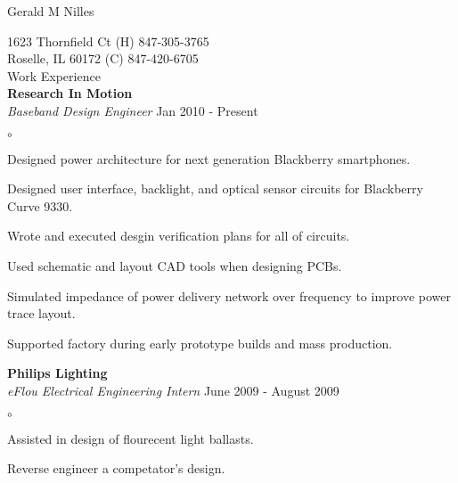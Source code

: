 \documentclass[12pt, letterpaper]{letter}
\begin{document}
\pagestyle{empty}


\newcommand{\myname}[1]{\begin{center} \Huge #1 \normalsize \\ \end{center}}
\newcommand{\myhead}[1]{\LARGE #1 \normalsize \\}
\newcommand{\company}[1]{\hspace*{.5cm} \textbf{#1} \\}
\newcommand{\position}[2]{\hspace*{.5cm} \emph{#1} \hfill #2 \\}
\newenvironment{skills}{\begin{list}{$\circ$}{} \parskip0pt \topsep0pt }{\end{list}}
\newcommand{\skill}[1]{ \item #1 }

\myname{Gerald M Nilles}

1623 Thornfield Ct  \hfill (H) 847-305-3765 \\
Roselle, IL 60172   \hfill (C) 847-420-6705 \\

\myhead{Work Experience}
    \company{Research In Motion}
    \position{Baseband Design Engineer}{Jan 2010 - Present}
    \begin{skills}
        \skill{Designed power architecture for next generation Blackberry smartphones.}
        \skill{Designed user interface, backlight, and optical sensor circuits for Blackberry Curve 9330.}
        \skill{Wrote and executed desgin verification plans for all of circuits.}
        \skill{Used schematic and layout CAD tools when designing PCBs.}
        \skill{Simulated impedance of power delivery network over frequency to improve power trace layout.}
        \skill{Supported factory during early prototype builds and mass production.}
    \end{skills}

    \company{Philips Lighting}
    \position{eFlou Electrical Engineering Intern}{June 2009 - August 2009}
    \begin{skills}
        \skill{Assisted in design of flourecent light ballasts.}
        \skill{Reverse engineer a competator's design.}
    \end{skills}
\end{document}
